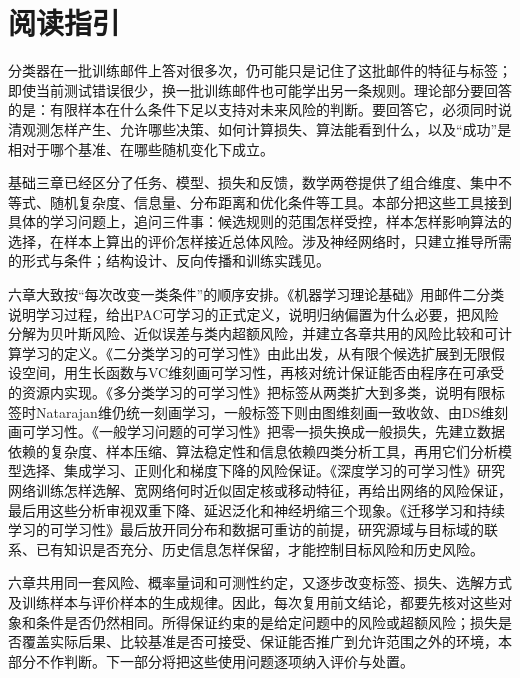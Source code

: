 \chapter*{阅读指引}

分类器在一批训练邮件上答对很多次，仍可能只是记住了这批邮件的特征与标签；即使当前测试错误很少，换一批训练邮件也可能学出另一条规则。理论部分要回答的是：有限样本在什么条件下足以支持对未来风险的判断。要回答它，必须同时说清观测怎样产生、允许哪些决策、如何计算损失、算法能看到什么，以及“成功”是相对于哪个基准、在哪些随机变化下成立。

基础三章已经区分了任务、模型、损失和反馈，数学两卷提供了组合维度、集中不等式、随机复杂度、信息量、分布距离和优化条件等工具。本部分把这些工具接到具体的学习问题上，追问三件事：候选规则的范围怎样受控，样本怎样影响算法的选择，在样本上算出的评价怎样接近总体风险。涉及神经网络时，只建立推导所需的形式与条件；结构设计、反向传播和训练实践见。

六章大致按“每次改变一类条件”的顺序安排。《机器学习理论基础》用邮件二分类说明学习过程，给出PAC可学习的正式定义，说明归纳偏置为什么必要，把风险分解为贝叶斯风险、近似误差与类内超额风险，并建立各章共用的风险比较和可计算学习的定义。《二分类学习的可学习性》由此出发，从有限个候选扩展到无限假设空间，用生长函数与VC维刻画可学习性，再核对统计保证能否由程序在可承受的资源内实现。《多分类学习的可学习性》把标签从两类扩大到多类，说明有限标签时Natarajan维仍统一刻画学习，一般标签下则由图维刻画一致收敛、由DS维刻画可学习性。《一般学习问题的可学习性》把零一损失换成一般损失，先建立数据依赖的复杂度、样本压缩、算法稳定性和信息依赖四类分析工具，再用它们分析模型选择、集成学习、正则化和梯度下降的风险保证。《深度学习的可学习性》研究网络训练怎样选解、宽网络何时近似固定核或移动特征，再给出网络的风险保证，最后用这些分析审视双重下降、延迟泛化和神经坍缩三个现象。《迁移学习和持续学习的可学习性》最后放开同分布和数据可重访的前提，研究源域与目标域的联系、已有知识是否充分、历史信息怎样保留，才能控制目标风险和历史风险。

六章共用同一套风险、概率量词和可测性约定，又逐步改变标签、损失、选解方式及训练样本与评价样本的生成规律。因此，每次复用前文结论，都要先核对这些对象和条件是否仍然相同。所得保证约束的是给定问题中的风险或超额风险；损失是否覆盖实际后果、比较基准是否可接受、保证能否推广到允许范围之外的环境，本部分不作判断。下一部分将把这些使用问题逐项纳入评价与处置。
